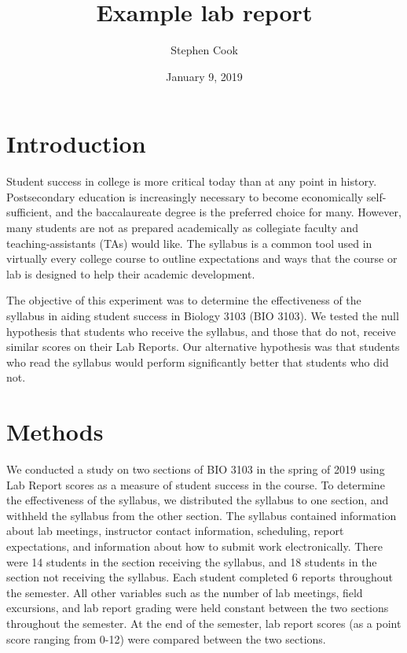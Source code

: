 \documentclass[]{article}
\title{Example lab report}
\author{Stephen Cook}
\date{January 9, 2019}
\begin{document}
\maketitle

\hypertarget{introduction}{%
\section{Introduction}\label{introduction}}

Student success in college is more critical today than at any point in
history. Postsecondary education is increasingly necessary to become
economically self-sufficient, and the baccalaureate degree is the
preferred choice for many. However, many students are not as prepared
academically as collegiate faculty and teaching-assistants (TAs) would
like. The syllabus is a common tool used in virtually every college
course to outline expectations and ways that the course or lab is
designed to help their academic development.

The objective of this experiment was to determine the effectiveness of
the syllabus in aiding student success in Biology 3103 (BIO 3103). We
tested the null hypothesis that students who receive the syllabus, and
those that do not, receive similar scores on their Lab Reports. Our
alternative hypothesis was that students who read the syllabus would
perform significantly better that students who did not.

\hypertarget{methods}{%
\section{Methods}\label{methods}}

We conducted a study on two sections of BIO 3103 in the spring of 2019
using Lab Report scores as a measure of student success in the course.
To determine the effectiveness of the syllabus, we distributed the
syllabus to one section, and withheld the syllabus from the other
section. The syllabus contained information about lab meetings,
instructor contact information, scheduling, report expectations, and
information about how to submit work electronically. There were 14
students in the section receiving the syllabus, and 18 students in the
section not receiving the syllabus. Each student completed 6 reports
throughout the semester. All other variables such as the number of lab
meetings, field excursions, and lab report grading were held constant
between the two sections throughout the semester. At the end of the
semester, lab report scores (as a point score ranging from 0-12) were
compared between the two sections.
\end{document}
